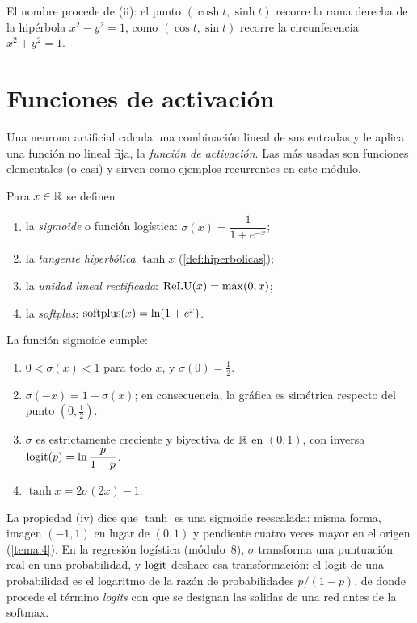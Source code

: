 El nombre procede de (ii): el punto $(\cosh t,\sinh t)$ recorre la rama derecha de la hipérbola $x^{2}-y^{2}=1$, como $(\cos t,\sin t)$ recorre la circunferencia $x^{2}+y^{2}=1$.

\section{Funciones de activación}

Una neurona artificial calcula una combinación lineal de sus entradas y le aplica una función no lineal fija, la \emph{función de activación}. Las más usadas son funciones elementales (o casi) y sirven como ejemplos recurrentes en este módulo.

\begin{definicion}\label{def:activaciones}
Para $x\in\mathbb{R}$ se definen
\begin{enumerate}
  \item la \emph{sigmoide} o función logística: $\sigma(x)=\dfrac{1}{1+e^{-x}}$;
  \item la \emph{tangente hiperbólica} $\tanh x$ (\cref{def:hiperbolicas});
  \item la \emph{unidad lineal rectificada}: $\operatorname{ReLU}(x)=\max(0,x)$;
  \item la \emph{softplus}: $\operatorname{softplus}(x)=\ln(1+e^{x})$.
\end{enumerate}
\end{definicion}

\addtocounter{figure}{1}%

\begin{proposicion}\label{prop:sigmoide}
La función sigmoide cumple:
\begin{enumerate}
  \item $0<\sigma(x)<1$ para todo $x$, y $\sigma(0)=\tfrac12$.
  \item $\sigma(-x)=1-\sigma(x)$; en consecuencia, la gráfica es simétrica respecto del punto $(0,\tfrac12)$.
  \item $\sigma$ es estrictamente creciente y biyectiva de $\mathbb{R}$ en $(0,1)$, con inversa $\operatorname{logit}(p)=\ln\dfrac{p}{1-p}$.
  \item $\tanh x=2\sigma(2x)-1$.
\end{enumerate}
\end{proposicion}

La propiedad (iv) dice que $\tanh$ es una sigmoide reescalada: misma forma, imagen $(-1,1)$ en lugar de $(0,1)$ y pendiente cuatro veces mayor en el origen (\cref{tema:4}). En la regresión logística (módulo~8), $\sigma$ transforma una puntuación real en una probabilidad, y $\operatorname{logit}$ deshace esa transformación: el logit de una probabilidad es el logaritmo de la razón de probabilidades $p/(1-p)$, de donde procede el término \emph{logits} con que se designan las salidas de una red antes de la softmax.


